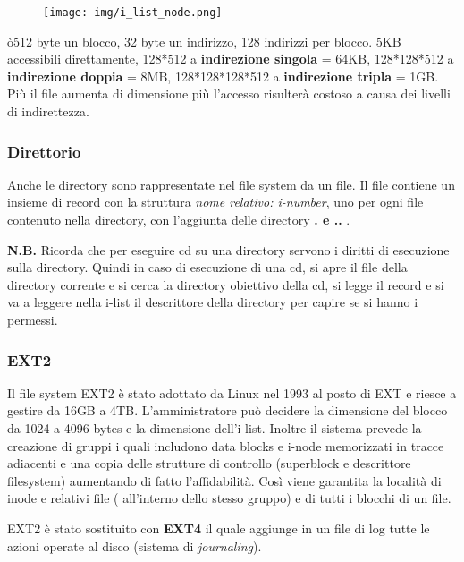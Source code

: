 \documentclass{article}
\begin{document}
\begin{figure}[h!]
    \begin{center}
        \texttt{[image: img/i\_list\_node.png]}      
    \end{center}
\end{figure}
\noindent ò512 byte un blocco, 32 byte un indirizzo, 128 indirizzi per blocco. 
5KB accessibili direttamente, 128*512 a \textbf{indirezione singola} = 64KB,
128*128*512 a \textbf{indirezione doppia} = 8MB, 
128*128*128*512 a \textbf{indirezione tripla}  = 1GB.
Più il file aumenta di dimensione più l'accesso risulterà 
costoso a causa dei livelli di indirettezza.

\subsubsection{Direttorio}
Anche le directory sono rappresentate nel file system da un 
file. Il file contiene un insieme di record con la struttura
\textit{nome relativo: i-number}, uno per ogni file contenuto
nella directory, con l'aggiunta delle directory \textbf{. e ..} .

\noindent \textbf{N.B.} Ricorda che per eseguire cd su una
directory servono i diritti di esecuzione sulla directory.
Quindi in caso di esecuzione di una cd, si apre il file della
directory corrente e si cerca la directory obiettivo della cd,
si legge il record e si va a leggere nella i-list il descrittore
della directory per capire se si hanno i permessi.

\subsubsection{EXT2}
Il file system EXT2 è stato adottato da Linux nel 1993 al posto 
di EXT e riesce a gestire da 16GB a 4TB. L'amministratore può decidere la dimensione
del blocco da 1024 a 4096 bytes e la dimensione dell'i-list.
Inoltre il sistema prevede la creazione di gruppi i quali includono
 data blocks e i-node memorizzati in tracce adiacenti
e una copia delle strutture di controllo (superblock e
 descrittore filesystem) aumentando di fatto l'affidabilità.
Così viene garantita la località di inode e relativi file (
all'interno dello stesso gruppo) e di tutti i blocchi di un 
file.
\medskip

\noindent EXT2 è stato sostituito con \textbf{EXT4} il quale aggiunge 
in un file di log tutte le azioni operate al disco (sistema di
\textit{journaling}).
\medskip

\pagebreak
\end{document}
